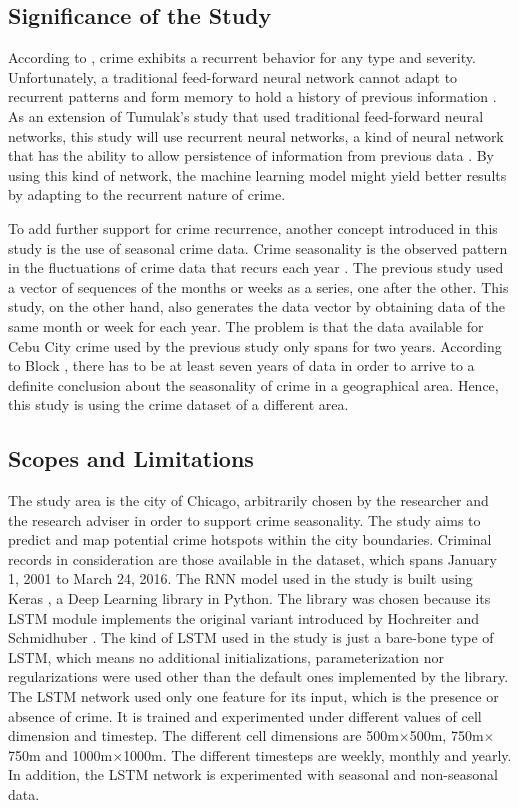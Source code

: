 \subsection{Significance of the Study}

    According to \cite{perc2013understanding}, crime exhibits a recurrent behavior for any type and severity. Unfortunately, a traditional feed-forward neural network cannot adapt to recurrent patterns and form memory to hold a history of previous information \cite{mikolov2010recurrent}. As an extension of Tumulak's study \cite{tumulak2015crime} that used traditional feed-forward neural networks, this study will use recurrent neural networks, a kind of neural network that has the ability to allow persistence of information from previous data \cite{graves2012supervised}. By using this kind of network, the machine learning model might yield better results by adapting to the recurrent nature of crime.

    To add further support for crime recurrence, another concept introduced in this study is the use of seasonal crime data. Crime seasonality is the observed pattern in the fluctuations of crime data that recurs each year \cite{lauritsen2014seasonal}. The previous study used a vector of sequences of the months or weeks as a series, one after the other. This study, on the other hand, also generates the data vector by obtaining data of the same month or week for each year. The problem is that the data available for Cebu City crime used by the previous study only spans for two years. According to Block \cite{block1984crime}, there has to be at least seven years of data in order to arrive to a definite conclusion about the seasonality of crime in a geographical area. Hence, this study is using the crime dataset of a different area.

\subsection{Scopes and Limitations}

    The study area is the city of Chicago, arbitrarily chosen by the researcher and the research adviser in order to support crime seasonality. The study aims to predict and map potential crime hotspots within the city boundaries. Criminal records in consideration are those available in the dataset, which spans January 1, 2001 to March 24, 2016. The RNN model used in the study is built using Keras \cite{chollet2015keras}, a Deep Learning library in Python. The library was chosen because its LSTM module implements the original variant introduced by Hochreiter and Schmidhuber \cite{hochreiter1997long}. The kind of LSTM used in the study is just a bare-bone type of LSTM, which means no additional initializations, parameterization nor regularizations were used other than the default ones implemented by the library. The LSTM network used only one feature for its input, which is the presence or absence of crime. It is trained and experimented under different values of cell dimension and timestep. The different cell dimensions are 500m\(\times\)500m, 750m\(\times\)750m and 1000m\(\times\)1000m. The different timesteps are weekly, monthly and yearly. In addition, the LSTM network is experimented with seasonal and non-seasonal data.